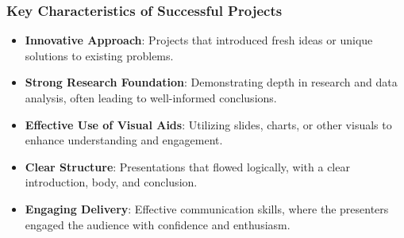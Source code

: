 \documentclass[aspectratio=169]{beamer}
\begin{document}
\begin{frame}[fragile]
    \frametitle{Key Characteristics of Successful Projects}
    \begin{itemize}
        \item \textbf{Innovative Approach}: Projects that introduced fresh ideas or unique solutions to existing problems.
        \item \textbf{Strong Research Foundation}: Demonstrating depth in research and data analysis, often leading to well-informed conclusions.
        \item \textbf{Effective Use of Visual Aids}: Utilizing slides, charts, or other visuals to enhance understanding and engagement.
        \item \textbf{Clear Structure}: Presentations that flowed logically, with a clear introduction, body, and conclusion.
        \item \textbf{Engaging Delivery}: Effective communication skills, where the presenters engaged the audience with confidence and enthusiasm.
    \end{itemize}
\end{frame}
\end{document}

